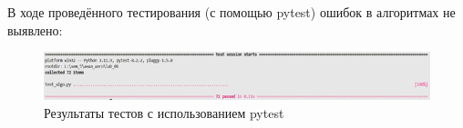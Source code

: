 В ходе проведённого тестирования (с помощью pytest) ошибок в алгоритмах не выявлено:\\[0.1cm]
\begin{figure}[H]  %
    \centering
    \includegraphics[width=1\textwidth]{img/pytest_result.png}
    \caption{Результаты тестов с использованием pytest}
\end{figure}
\newpage